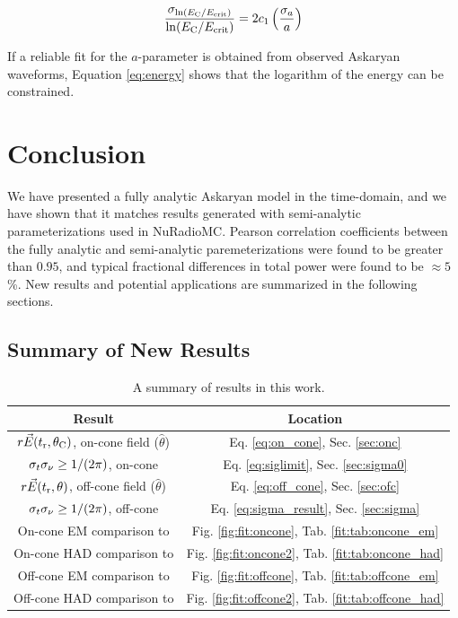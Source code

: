 \documentclass[amsmath,amssymb,aps,prd,10pt,twocolumn]{revtex4}
\begin{document}
\begin{equation}
\frac{\sigma_{\ln(E_{\rm C}/E_{\rm crit})}}{\ln(E_{\rm C}/E_{\rm crit})} = 2 c_1 \left( \frac{\sigma_a}{a}\right) \label{eq:energy}
\end{equation}

If a reliable fit for the $a$-parameter is obtained from observed Askaryan waveforms, Equation \ref{eq:energy} shows that the logarithm of the energy can be constrained.

\section{Conclusion}
\label{sec:conc}

We have presented a fully analytic Askaryan model in the time-domain, and we have shown that it matches results generated with semi-analytic parameterizations used in NuRadioMC.  Pearson correlation coefficients between the fully analytic and semi-analytic paremeterizations were found to be greater than $0.95$, and typical fractional differences in total power were found to be $\approx 5$\%.  New results and potential applications are summarized in the following sections.

\subsection{Summary of New Results}

\begingroup
\squeezetable
\begin{table}
\renewcommand{\arraystretch}{1.75}
\centering
\begin{tabular}{|c|c|}
\hline
Result & Location \\ \hline
$r\vec{E}(t_{\rm r},\theta_{\rm C})$, on-cone field ($\hat{\theta}$) & Eq. \ref{eq:on_cone}, Sec. \ref{sec:onc} \\
$\sigma_{t} \sigma_{\rm \nu} \geq 1/(2\pi)$, on-cone & Eq. \ref{eq:siglimit}, Sec. \ref{sec:sigma0} \\
$r\vec{E}(t_{\rm r},\theta)$, off-cone field ($\hat{\theta}$) & Eq. \ref{eq:off_cone}, Sec. \ref{sec:ofc} \\
$\sigma_{t} \sigma_{\rm \nu} \geq 1/(2\pi)$, off-cone & Eq. \ref{eq:sigma_result}, Sec. \ref{sec:sigma} \\
On-cone EM comparison to \cite{PhysRevD.101.083005} & Fig. \ref{fig:fit:oncone}, Tab. \ref{fit:tab:oncone_em} \\ 
On-cone HAD comparison to \cite{PhysRevD.101.083005} & Fig. \ref{fig:fit:oncone2}, Tab. \ref{fit:tab:oncone_had} \\ 
Off-cone EM comparison to \cite{PhysRevD.101.083005} & Fig. \ref{fig:fit:offcone}, Tab. \ref{fit:tab:offcone_em} \\ 
Off-cone HAD comparison to \cite{PhysRevD.101.083005} & Fig. \ref{fig:fit:offcone2}, Tab. \ref{fit:tab:offcone_had} \\ 
\hline
\end{tabular}
\caption{\label{tab:conc} A summary of results in this work.}
\end{table}
\endgroup
\end{document}
